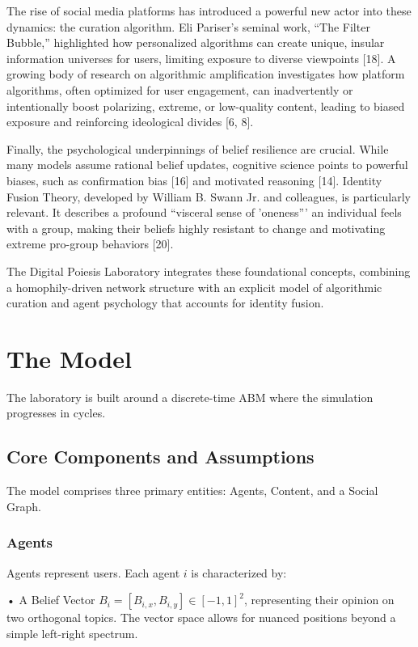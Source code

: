 \documentclass[11pt]{article}
\begin{document}
The rise of social media platforms has introduced a powerful new actor into these dynamics: the curation algorithm. Eli Pariser’s seminal work, ``The Filter Bubble,'' highlighted how personalized algorithms can create unique, insular information universes for users, limiting exposure to diverse viewpoints [18]. A growing body of research on algorithmic amplification investigates how platform algorithms, often optimized for user engagement, can inadvertently or intentionally boost polarizing, extreme, or low-quality content, leading to biased exposure and reinforcing ideological divides [6, 8].

Finally, the psychological underpinnings of belief resilience are crucial. While many models assume rational belief updates, cognitive science points to powerful biases, such as confirmation bias [16] and motivated reasoning [14]. Identity Fusion Theory, developed by William B. Swann Jr. and colleagues, is particularly relevant. It describes a profound ``visceral sense of 'oneness''' an individual feels with a group, making their beliefs highly resistant to change and motivating extreme pro-group behaviors [20].

The Digital Poiesis Laboratory integrates these foundational concepts, combining a homophily-driven network structure with an explicit model of algorithmic curation and agent psychology that accounts for identity fusion.

\section{The Model}

The laboratory is built around a discrete-time ABM where the simulation progresses in cycles.

\subsection{Core Components and Assumptions}

The model comprises three primary entities: Agents, Content, and a Social Graph.

\subsubsection{Agents}

Agents represent users. Each agent $i$ is characterized by:

• A Belief Vector $B_i = [B_{i,x}, B_{i,y}] \in [-1, 1]^2$, representing their opinion on two orthogonal topics. The vector space allows for nuanced positions beyond a simple left-right spectrum.
\end{document}
